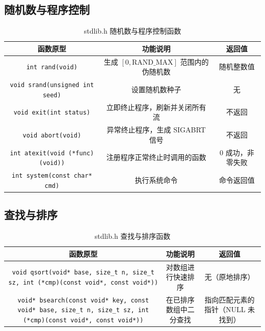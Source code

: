 \subsection{随机数与程序控制}

\begin{table}[H]
\centering
\small
\renewcommand{\arraystretch}{1.6}
\begin{tabulary}{\linewidth}{CCC}
\toprule
\textbf{函数原型} & \textbf{功能说明} & \textbf{返回值} \\ \midrule
\texttt{int rand(void)} & 生成 $[0, \text{RAND\_MAX}]$ 范围内的伪随机数 & 随机整数值 \\ 
\texttt{void srand(unsigned int seed)} & 设置随机数种子 & 无 \\ 
\texttt{void exit(int status)} & 立即终止程序，刷新并关闭所有流 & 不返回 \\ 
\texttt{void abort(void)} & 异常终止程序，生成 SIGABRT 信号 & 不返回 \\ 
\texttt{int atexit(void (*func)(void))} & 注册程序正常终止时调用的函数 & 0 成功，非零失败 \\ 
\texttt{int system(const char* cmd)} & 执行系统命令 & 命令返回值 \\ \bottomrule
\end{tabulary}
\caption{stdlib.h 随机数与程序控制函数}
\label{tab:stdlib_ctrl}
\end{table}

\subsection{查找与排序}

\begin{table}[H]
\centering
\small
\renewcommand{\arraystretch}{1.6}
\begin{tabulary}{\linewidth}{CCC}
\toprule
\textbf{函数原型} & \textbf{功能说明} & \textbf{返回值} \\ \midrule
\texttt{void qsort(void* base, size\_t n, size\_t sz, int (*cmp)(const void*, const void*))} & 对数组进行快速排序 & 无（原地排序） \\ 
\texttt{void* bsearch(const void* key, const void* base, size\_t n, size\_t sz, int (*cmp)(const void*, const void*))} & 在已排序数组中二分查找 & 指向匹配元素的指针（NULL 未找到） \\ \bottomrule
\end{tabulary}
\caption{stdlib.h 查找与排序函数}
\label{tab:stdlib_search}
\end{table}

